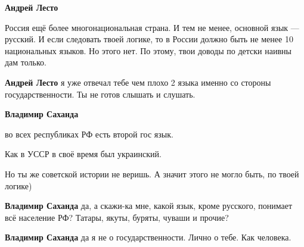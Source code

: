 \begin{itemize}
\begin{itemize}
\textbf{Андрей Лесто} 

Россия ещё более многонациональная страна. И тем не менее, основной язык —
русский. И если следовать твоей логике, то в России должно быть не менее 10
национальных языков. Но этого нет. По этому, твои доводы по детски наивны дам
только.

 
\textbf{Андрей Лесто} я уже отвечал тебе чем плохо 2 языка именно со стороны государственности. Ты не готов слышать и слушать.

 
\textbf{Владимир Саханда} 

во всех республиках РФ есть второй гос язык.

Как в УССР в своё время был украинский.

Но ты же советской истории не веришь. А значит этого не могло быть, по твоей
логике)

 
\textbf{Владимир Саханда} да, а скажи-ка мне, какой язык, кроме русского, понимает всё население РФ? Татары, якуты, буряты, чуваши и прочие?

 
\textbf{Владимир Саханда} да я не о государственности. Лично о тебе. Как человека.

 

\end{itemize}
\end{itemize}
